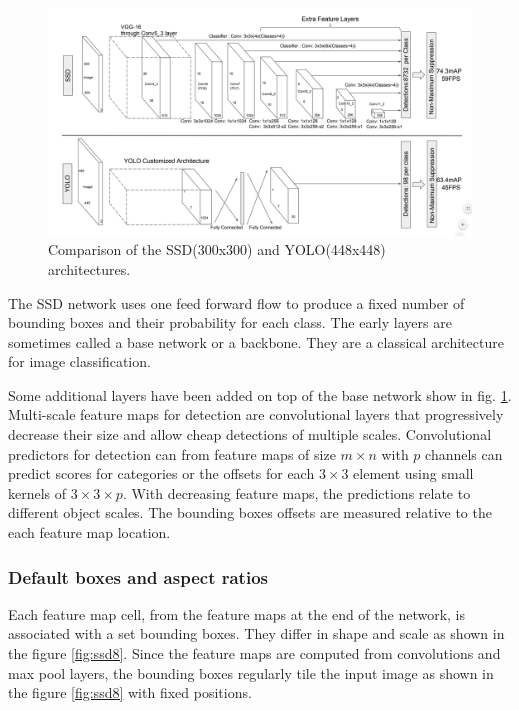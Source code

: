 \documentclass[a4paper,12pt,titlepage]{article}
\numberwithin{figure}{section}
\begin{document}
\begin{figure}[h!]
\centering
\includegraphics[width=1\linewidth]{fig/SSDvsYOLO.png}
\caption{Comparison of the SSD\cite{liu2016ssd}(300x300) and YOLO\cite{redmon2016you}(448x448) architectures.}
\label{fig:ssd_vs_yolo}
\end{figure}

The SSD network uses one feed forward flow to produce a fixed number of bounding boxes and their probability for each class. The early layers are sometimes called a base network or a backbone. They are a classical architecture for image classification. 

Some additional layers have been added on top of the base network show in fig. \ref{fig:ssd_vs_yolo}. Multi-scale feature maps for detection are convolutional layers that progressively decrease their size and allow cheap detections of multiple scales. Convolutional predictors for detection can from feature maps of size $m \times n$ with $p$ channels can predict scores for categories or the offsets for each $3 \times 3$ element  using small kernels of $3 \times 3 \times p$. With decreasing feature maps, the predictions relate to different object scales. The bounding boxes offsets are measured relative to the each feature map location. 

\subsubsection{Default boxes and aspect ratios}
Each feature map cell, from the feature maps at the end of the network, is associated with a set bounding boxes. They differ in shape and scale as shown in the figure \ref{fig:ssd8}. Since the feature maps are computed from convolutions and max pool layers, the bounding boxes regularly tile the input image as shown in the figure \ref{fig:ssd8} with fixed positions.
\end{document}
